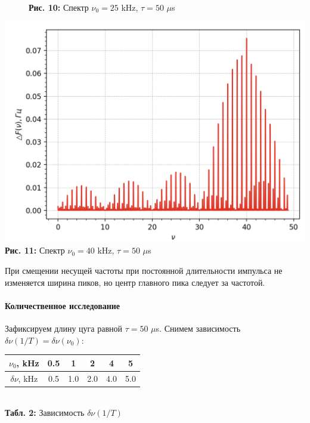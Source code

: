 \documentclass[12pt,a4paper]{scrartcl}
\begin{document}
\begin{figure}[h]
\begin{minipage}{0.5\linewidth}
\begin{center}
				\\\textbf{Рис. 10:} Спектр $\nu_0 = 25$ kHz, $\tau = 50$ $\mu$s
			\end{center}
		\end{minipage}
	\end{figure}

	\begin{center}
		\includegraphics[scale=0.18]{PIC_11.png}
		\\\textbf{Рис. 11:} Спектр $\nu_0 = 40$ kHz, $\tau = 50$ $\mu$s
	\end{center}
	
	При смещении несущей частоты при постоянной длительности импульса не изменяется ширина пиков, но центр главного пика следует за частотой.
	
	\paragraph{Количественное исследование} \hfill
	
	Зафиксируем длину цуга равной $\tau = 50$ $\mu$s. Снимем зависимость $\delta \nu (1/T) = \delta \nu (\nu_0)$:
	
	\begin{center}
		\begin{tabular}{|c|c|c|c|c|c|}
			\hline
			$\nu_0$, kHz & 0.5 & 1 & 2 & 4 & 5
			\\\hline
			$\delta \nu$, kHz & 0.5 & 1.0 & 2.0 & 4.0 & 5.0
			\\\hline
		\end{tabular}
		\\\textbf{Табл. 2:} Зависимость $\delta \nu (1/T)$
	\end{center}
	
\end{document}
